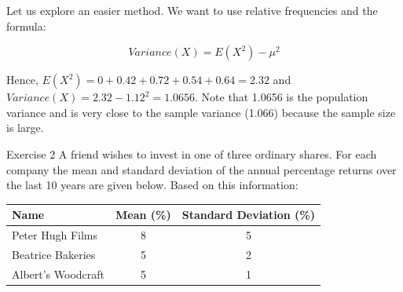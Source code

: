 \documentclass[
  ignorenonframetext,
  aspectratio=43,
]{beamer}
\begin{document}
\begin{frame}{}
\protect\hypertarget{section-2}{}
Let us explore an easier method. We want to use relative frequencies and
the formula:

\vspace{-5pt}

\[
Variance(X) = E(X^2) - \mu^2
\]

\vspace{-5pt}

\begin{table}
\centering
\scriptsize
{}
\end{table}

\vspace{7pt}

Hence, \(E(X^2)=0+0.42+0.72+0.54+0.64=2.32\) and
\(Variance (X)=2.32- 1.12^2=1.0656\). Note that 1.0656 is the population
variance and is very close to the sample variance (1.066) because the
sample size is large.
\end{frame}

\begin{frame}{Exercise 2}
\protect\hypertarget{exercise-2}{}
A friend wishes to invest in one of three ordinary shares. For each
company the mean and standard deviation of the annual percentage returns
over the last 10 years are given below. Based on this information:
\vspace{10pt}

\begin{longtable}[]{@{}lcc@{}}
\toprule()
Name & Mean (\%) & Standard Deviation (\%) \\
\midrule()
\endhead
Peter Hugh Films & 8 & 5 \\
Beatrice Bakeries & 5 & 2 \\
Albert's Woodcraft & 5 & 1 \\
\bottomrule()
\end{longtable}
\end{frame}
\end{document}
